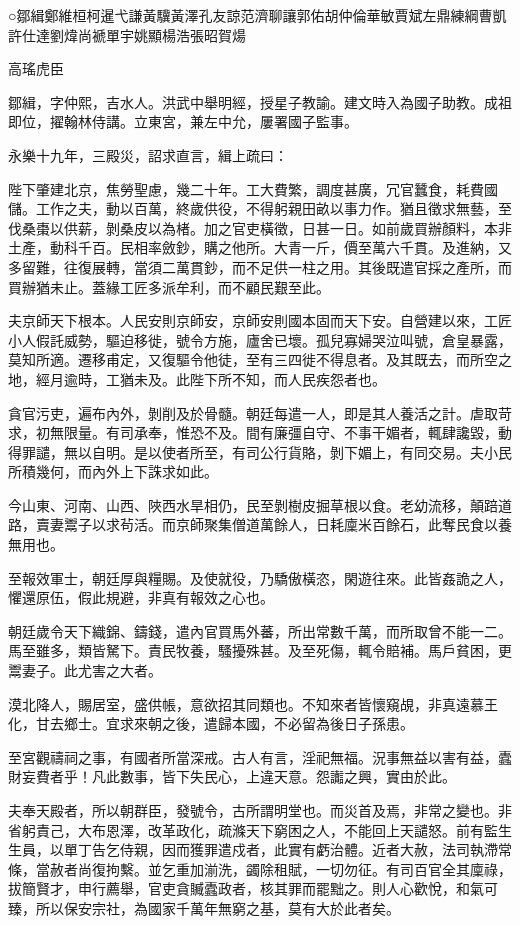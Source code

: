 
\begin{pinyinscope}
○鄒緝鄭維桓柯暹弋謙黃驥黃澤孔友諒范濟聊讓郭佑胡仲倫華敏賈斌左鼎練綱曹凱許仕達劉煒尚褫單宇姚顯楊浩張昭賀煬

高瑤虎臣

鄒緝，字仲熙，吉水人。洪武中舉明經，授星子教諭。建文時入為國子助教。成祖即位，擢翰林侍講。立東宮，兼左中允，屢署國子監事。

永樂十九年，三殿災，詔求直言，緝上疏曰：

陛下肇建北京，焦勞聖慮，幾二十年。工大費繁，調度甚廣，冗官蠶食，耗費國儲。工作之夫，動以百萬，終歲供役，不得躬親田畝以事力作。猶且徵求無藝，至伐桑棗以供薪，剝桑皮以為楮。加之官吏橫徵，日甚一日。如前歲買辦顏料，本非土產，動科千百。民相率斂鈔，購之他所。大青一斤，價至萬六千貫。及進納，又多留難，往復展轉，當須二萬貫鈔，而不足供一柱之用。其後既遣官採之產所，而買辦猶未止。蓋緣工匠多派牟利，而不顧民艱至此。

夫京師天下根本。人民安則京師安，京師安則國本固而天下安。自營建以來，工匠小人假託威勢，驅迫移徙，號令方施，廬舍已壞。孤兒寡婦哭泣叫號，倉皇暴露，莫知所適。遷移甫定，又復驅令他徒，至有三四徙不得息者。及其既去，而所空之地，經月逾時，工猶未及。此陛下所不知，而人民疾怨者也。

貪官污吏，遍布內外，剝削及於骨髓。朝廷每遣一人，即是其人養活之計。虐取苛求，初無限量。有司承奉，惟恐不及。間有廉彊自守、不事干媚者，輒肆讒毀，動得罪譴，無以自明。是以使者所至，有司公行貨賂，剝下媚上，有同交易。夫小民所積幾何，而內外上下誅求如此。

今山東、河南、山西、陜西水旱相仍，民至剝樹皮掘草根以食。老幼流移，顛踣道路，賣妻鬻子以求茍活。而京師聚集僧道萬餘人，日耗廩米百餘石，此奪民食以養無用也。

至報效軍士，朝廷厚與糧賜。及使就役，乃驕傲橫恣，閑遊往來。此皆姦詭之人，懼還原伍，假此規避，非真有報效之心也。

朝廷歲令天下織錦、鑄錢，遣內官買馬外蕃，所出常數千萬，而所取曾不能一二。馬至雖多，類皆駑下。責民牧養，騷擾殊甚。及至死傷，輒令賠補。馬戶貧困，更鬻妻子。此尤害之大者。

漠北降人，賜居室，盛供帳，意欲招其同類也。不知來者皆懷窺覘，非真遠慕王化，甘去鄉士。宜求來朝之後，遣歸本國，不必留為後日子孫患。

至宮觀禱祠之事，有國者所當深戒。古人有言，淫祀無福。況事無益以害有益，蠹財妄費者乎！凡此數事，皆下失民心，上違天意。怨讟之興，實由於此。

夫奉天殿者，所以朝群臣，發號令，古所謂明堂也。而災首及焉，非常之變也。非省躬責己，大布恩澤，改革政化，疏滌天下窮困之人，不能回上天譴怒。前有監生生員，以單丁告乞侍親，因而獲罪遣戍者，此實有虧治體。近者大赦，法司執滯常條，當赦者尚復拘繫。並乞重加湔洗，蠲除租賦，一切勿征。有司百官全其廩祿，拔簡賢才，申行薦舉，官吏貪贓蠹政者，核其罪而罷黜之。則人心歡悅，和氣可臻，所以保安宗社，為國家千萬年無窮之基，莫有大於此者矣。


\end{pinyinscope}
